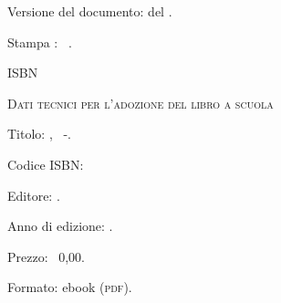 {{\vspace{2ex}
 Versione del documento: {\docvers} del {\oggi}.

 Stampa \edizione : \mese\ \anno.

 ISBN \mcisbn

\vspace{2ex}
 {\scshape{Dati tecnici per l'adozione del libro a scuola}}

 Titolo: \serie, \titolo\ -\edizione.

 Codice ISBN: \mcisbn 

 Editore: \href{http://www.matematicamente.it}{\editore}. 

 Anno di edizione: \anno.

 Prezzo: \officialeuro\ 0,00.

 Formato: ebook (\scshape{pdf}).
}}
